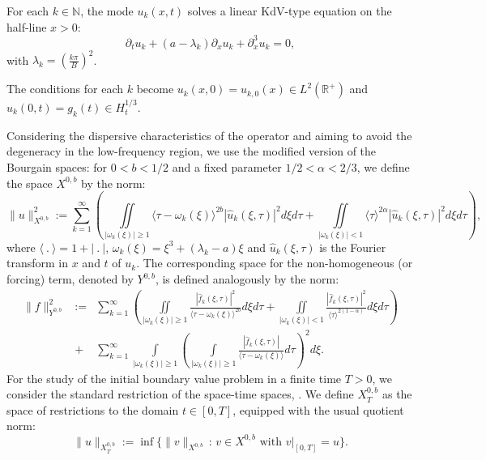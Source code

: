 \documentclass[11pt]{article}
\numberwithin{equation}{section}
\begin{document}
For each $k \in \mathbb{N}$, the mode $u_{k}(x,t)$ solves a linear KdV-type equation on the half-line $x > 0$:\begin{equation}\partial_t u_{k} + (a-\lambda_{k}) \partial_x u_{k} + \partial_x^3 u_{k} = 0,\end{equation}
with $\lambda_k = \left(\frac{k\pi}{B}\right)^2$.

The conditions for each $k$ become $u_{k}(x, 0) = u_{k,0}(x) \in L^2(\mathbb{R}^+)$ and $u_{k}(0, t) = g_{k}(t) \in H^{1/3}_t$.

Considering the dispersive characteristics of the operator and aiming to avoid the degeneracy in the low-frequency region, we use the modified version of the Bourgain spaces: for $0<b<1/2$ and a fixed parameter $1/2 < \alpha < 2/3$, we define the space $X^{0,b}$ by the norm:
\begin{equation}
\|u\|_{X^{0,b}}^2 := \sum_{k=1}^{\infty} \left( \underset{|\omega_k(\xi)| \ge 1}{\iint} \langle \tau-\omega_k(\xi)\rangle^{2b} |\widehat{u}_k(\xi,\tau)|^2 d\xi d\tau + \underset{|\omega_k(\xi)| < 1}{\iint} \langle \tau \rangle^{2\alpha} |\widehat{u}_k(\xi,\tau)|^2 d\xi d\tau \right),\end{equation}
where $\langle\ .\ \rangle=1+|\ .\ |$, $\omega_{k}(\xi)=\xi^{3}+(\lambda_{k}-a)\xi$ and $\widehat{u}_k(\xi,\tau)$ is the Fourier transform in $x$ and $t$ of $u_k$. The corresponding space for the non-homogeneous (or forcing) term, denoted by $Y^{0,b}$, is defined analogously by the norm:
\begin{eqnarray}
    \|f\|_{Y^{0,b}}^2 &:=& \sum_{k=1}^{\infty} \left( \underset{|\omega_k(\xi)| \ge 1}{\iint} \frac{|\widehat{f}_k(\xi,\tau)|^2}{\langle \tau-\omega_k(\xi)\rangle^{2b}} d\xi d\tau + \underset{|\omega_k(\xi)| < 1}{\iint} \frac{|\widehat{f}_k(\xi,\tau)|^2}{\langle \tau \rangle^{2(1-\alpha)}} d\xi d\tau \right)\\ &+& \sum_{k=1}^{\infty} \underset{|\omega_{k}(\xi)| \ge 1}{\int} \left( \underset{|\omega_{k}(\xi)| \ge 1}{\int} \frac{|\widehat{f}_{k}(\xi,\tau)|}{\langle \tau-\omega_{k}(\xi)\rangle} d\tau \right)^{2} d\xi.\nonumber
\end{eqnarray}
For the study of the initial boundary value problem in a finite time $T > 0$, we consider the standard restriction of the space-time spaces, \cite{MP}. We define $X^{0,b}_T$ as the space of restrictions to the domain $t \in [0,T]$, equipped with the usual quotient norm:
\begin{equation}\|u\|_{X^{0,b}_T} := \inf \big\{ \|v\|_{X^{0,b}} \,:\, v \in X^{0,b} \text{ with } v|_{[0,T]} = u \big\}.\end{equation}
\end{document}
